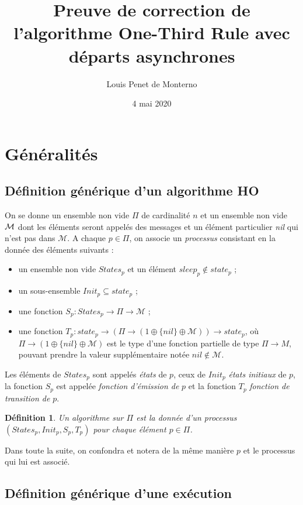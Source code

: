 \documentclass{article}
\title{Preuve de correction de l'algorithme One-Third Rule avec départs asynchrones}
\date{4 mai 2020}
\author{Louis Penet de Monterno}
\newtheorem{definition}{Définition}
\begin{document}
\maketitle
  
\section{Généralités}

\subsection{Définition générique d'un algorithme HO}

On se donne un ensemble non vide $\Pi$ de cardinalit\'e $n$ et  un ensemble non vide ${\cal M}$ dont les \'el\'ements seront appel\'es des
	messages et un \'el\'ement particulier {\em nil} qui n'est pas dans $\mathcal{M}$.
A chaque  $p \in \Pi$,  on associe  un {\em processus} consistant en la donn\'ee des \'el\'ements 
	suivants :
	\begin{itemize}
	\item un ensemble non vide $States_p$ et un  \'el\'ement $sleep_p \notin state_p$ ;
	\item un sous-ensemble   $Init_p \subseteq state_p$ ;
	\item une fonction $S_p : States_p \rightarrow \Pi \rightarrow \mathcal{M}$ ;
	\item une fonction 
	  $T_p : state_p \rightarrow (\Pi \rightarrow (1 \oplus \{ nil \} \oplus \mathcal{M}))
	  \rightarrow state_p$,
	  où $\Pi \rightarrow (1 \oplus \{ nil \} \oplus \mathcal{M})$ est le type d'une fonction partielle
		de type $\Pi \rightarrow M$, pouvant prendre la valeur supplémentaire notée $nil \notin \mathcal{M}$.
	\end{itemize}
Les \'el\'ements de 	$States_p$  sont appel\'es \emph{\'etats} de $p$, ceux de $Init_p$ \emph{\'etats initiaux} de $p$,
	la fonction $S_p$ est appel\'ee \emph{fonction d'émission de} $p$ et la fonction $T_p$ \emph{fonction de transition de} $p$.

\begin{definition}\label{def:algo}
Un algorithme  sur $\Pi$ est la donn\'ee d'un processus $(States_p, Init_p, S_p,T_p)$ pour chaque  \'el\'ement $p \in \Pi$.
\end{definition}
\noindent Dans toute la suite, on confondra et notera de la m\^eme mani\`ere $p$ et le processus qui lui est associ\'e.

\subsection{Définition générique d'une exécution}
\end{document}
